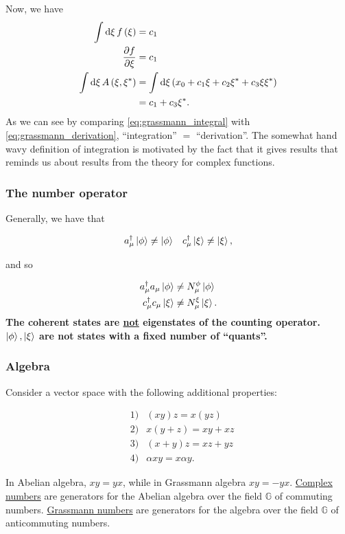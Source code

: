 Now, we have 
\begin{align}
\int\dd{\xi} f\left(\xi\right) &= c_1 \\
\pdv{f}{\xi} &= c_1 \\
\int\dd{\xi} A\left(\xi, \xi^*\right) &= \int\dd{\xi} \left(x_0+c_1\xi+c_2\xi^*+c_3\xi\xi^*\right)\nonumber \\
&=c_1 + c_3\xi^*. \label{eq:grassmann_integral}
\end{align}
As we can see by comparing \eqref{eq:grassmann_integral} with \eqref{eq:grassmann_derivation}, ``integration'' $=$ ``derivation''. The somewhat hand wavy definition of integration is motivated by the fact that it gives results that reminds us about results from the theory for complex functions. 

\subsubsection{The number operator}
Generally, we have that 

\begin{align}
&a_\mu^\dagger\ket{\phi} \ne \ket{\phi} & c_\mu^\dagger\ket{\xi} \ne \ket{\xi}, 
\end{align}

and so

\begin{align}
a_\mu^\dagger a_\mu\ket{\phi} &\ne N_\mu^\phi\ket{\phi} \\ 
c_\mu^\dagger c_\mu\ket{\xi} &\ne N_\mu^\xi\ket{\xi}.
\end{align}
\textbf{The coherent states are \underline{not} eigenstates of the counting operator. $\ket{\phi}, \ket{\xi}$ are not states with a fixed number of ``quants''.}

\subsubsection{Algebra}

Consider a vector space with the following additional properties:

\begin{align*}
&1) & (xy)z =x(yz) \\
&2) & x(y+z) = xy+xz \\
&3)  & (x+y)z =xz+yz \\
&4) & \alpha xy = x\alpha y.
\end{align*}

In Abelian algebra, $xy = yx$, while in Grassmann algebra $xy = -yx$. \underline{Complex numbers} are generators for the Abelian algebra over the field $\mathbb{G}$ of commuting numbers. \underline{Grassmann numbers} are generators for the algebra over the field $\mathbb{G}$ of anticommuting numbers. 

